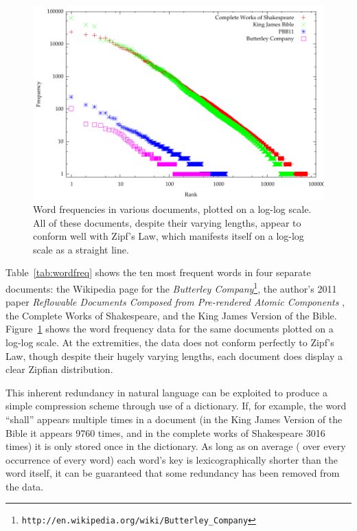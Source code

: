\begin{figure}
  \begin{center}
  \includegraphics[width=\textwidth]{gnuplot/wordfreq}
  \end{center}
  \caption[Word frequencies in various documents]{Word frequencies in various documents, plotted on a log-log scale. All of these documents, despite their varying lengths, appear to conform well with Zipf's Law, which manifests itself on a log-log scale as a straight line.}
  \label{fig:wordfreq}
\end{figure}

Table~\ref{tab:wordfreq} shows the ten most frequent words in four separate documents: the Wikipedia page for the \emph{Butterley Company}\footnote{\texttt{http://en.wikipedia.org/wiki/Butterley\_Company}}, the author's 2011 paper \emph{Reflowable Documents Composed from Pre-rendered Atomic Components} \cite{Pinkney2011}, the Complete Works of Shakespeare, and the King James Version of the Bible. Figure~\ref{fig:wordfreq} shows the word frequency data for the same documents plotted on a log-log scale. At the extremities, the data does not conform perfectly to Zipf's Law, though despite their hugely varying lengths, each document does display a clear Zipfian distribution.


This inherent redundancy in natural language can be exploited to produce a simple compression scheme through use of a dictionary. If, for example, the word ``shall'' appears multiple times in a document (in the King James Version of the Bible it appears 9760 times, and in the complete works of Shakespeare 3016 times) it is only stored once in the dictionary. As long as on average (\ie{} over every occurrence of every word) each word's key is lexicographically shorter than the word itself, it can be guaranteed that some redundancy has been removed from the data.

